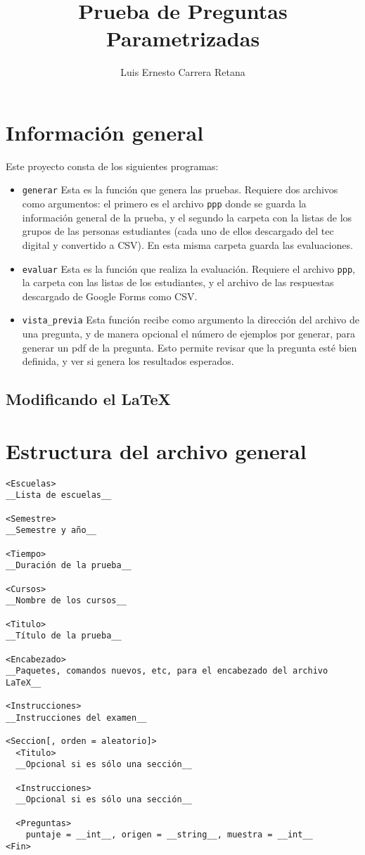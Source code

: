 \documentclass[12pt]{article}
\title{Prueba de Preguntas Parametrizadas}
\author{Luis Ernesto Carrera Retana}
\theoremstyle{definition}
\begin{document}
\maketitle

\section{Información general}

Este proyecto consta de los siguientes programas:
\begin{itemize}
  \item \verb|generar| Esta es la función que genera las pruebas. Requiere dos archivos como argumentos: el primero es el archivo \verb|ppp| donde se guarda la información general de la prueba, y el segundo la carpeta con la listas de los grupos de las personas estudiantes (cada uno de ellos descargado del tec digital y convertido a CSV). En esta misma carpeta guarda las evaluaciones.

  \item \verb|evaluar| Esta es la función que realiza la evaluación. Requiere el archivo \verb|ppp|, la carpeta con las listas de los estudiantes, y el archivo de las respuestas descargado de Google Forms como CSV.

  \item \verb|vista_previa| Esta función recibe como argumento la dirección del archivo de una pregunta, y de manera opcional el número de ejemplos por generar, para generar un pdf de la pregunta. Esto permite revisar que la pregunta esté bien definida, y ver si genera los resultados esperados.
\end{itemize}

\subsection{Modificando el \LaTeX}

\section{Estructura del archivo general}
\begin{verbatim}
<Escuelas>
__Lista de escuelas__

<Semestre>
__Semestre y año__

<Tiempo>
__Duración de la prueba__

<Cursos>
__Nombre de los cursos__

<Titulo>
__Título de la prueba__

<Encabezado>
__Paquetes, comandos nuevos, etc, para el encabezado del archivo LaTeX__

<Instrucciones>
__Instrucciones del examen__

<Seccion[, orden = aleatorio]>
  <Titulo>
  __Opcional si es sólo una sección__

  <Instrucciones>
  __Opcional si es sólo una sección__

  <Preguntas>
    puntaje = __int__, origen = __string__, muestra = __int__
<Fin>
\end{verbatim}
\end{document}
